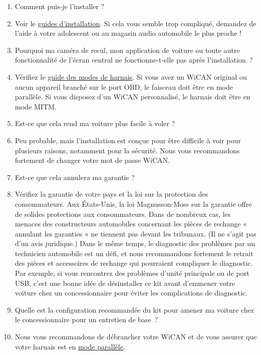 \documentclass[superscriptaddress,onecolumn,floatfix]{revtex4-2}
\begin{document}
\begin{enumerate}
  \item[Question :] Comment puis-je l'installer ?
  \item[UN:] Voir le \href{https://github.com/tylerharvey/Ioniq5_CAN/blob/main/guides/}{guides d'installation}. Si cela vous semble trop compliqué, demandez de l’aide à votre adolescent ou au magasin audio automobile le plus proche !
  \item[Question :] Pourquoi ma caméra de recul, mon application de voiture ou toute autre fonctionnalité de l'écran central ne fonctionne-t-elle pas après l'installation ?
  \item[UN:] Vérifiez le \href{https://github.com/tylerharvey/Ioniq5_CAN/blob/main/guides/harnesses/head_unit_MITM/MITM_harness_modes.pdf}{guide des modes de harnais}. Si vous avez un WiCAN original ou aucun appareil branché sur le port OBD, le faisceau doit être en mode parallèle. Si vous disposez d'un WiCAN personnalisé, le harnais doit être en mode MITM.
  \item[Question :] Est-ce que cela rend ma voiture plus facile à voler ?
  \item[UN:] Peu probable, mais l'installation est conçue pour être difficile à voir pour plusieurs raisons, notamment pour la sécurité. Nous vous recommandons fortement de changer votre mot de passe WiCAN. 
  \item[Question :] Est-ce que cela annulera ma garantie ?
  \item[UN:] Vérifiez la garantie de votre pays et la loi sur la protection des consommateurs. Aux États-Unis, la loi Magnusson-Moss sur la garantie offre de solides protections aux consommateurs. Dans de nombreux cas, les menaces des constructeurs automobiles concernant les pièces de rechange « annulant les garanties » ne tiennent pas devant les tribunaux. (Il ne s'agit pas d'un avis juridique.) Dans le même temps, le diagnostic des problèmes par un technicien automobile est un défi, et nous recommandons fortement le retrait des pièces et accessoires de rechange qui pourraient compliquer le diagnostic. Par exemple, si vous rencontrez des problèmes d'unité principale ou de port USB, c'est une bonne idée de désinstaller ce kit avant d'emmener votre voiture chez un concessionnaire pour éviter les complications de diagnostic. 
  \item[Question :] Quelle est la configuration recommandée du kit pour amener ma voiture chez le concessionnaire pour un entretien de base ?
  \item[UN:] Nous vous recommandons de débrancher votre WiCAN et de vous assurer que votre harnais est en \href{https://github.com/tylerharvey/Ioniq5_CAN/blob/main/guides/harnesses/head_unit_MITM/MITM_harness_modes.pdf}{mode parallèle}.

\end{enumerate}
\end{document}
